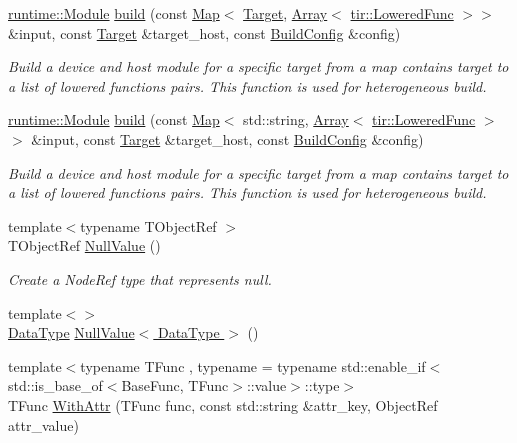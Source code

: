 \begin{DoxyCompactItemize}
\hyperlink{classtvm_1_1runtime_1_1Module}{runtime\+::\+Module} \hyperlink{namespacetvm_ab60e7a2ecb2573f5380a476d8c5aca6d}{build} (const \hyperlink{classtvm_1_1Map}{Map}$<$ \hyperlink{classtvm_1_1Target}{Target}, \hyperlink{classtvm_1_1Array}{Array}$<$ \hyperlink{classtvm_1_1tir_1_1LoweredFunc}{tir\+::\+Lowered\+Func} $>$$>$ \&input, const \hyperlink{classtvm_1_1Target}{Target} \&target\+\_\+host, const \hyperlink{classtvm_1_1BuildConfig}{Build\+Config} \&config)
\begin{DoxyCompactList}\small\item\em Build a device and host module for a specific target from a map contains target to a list of lowered functions pairs. This function is used for heterogeneous build. \end{DoxyCompactList}\item 
\hyperlink{classtvm_1_1runtime_1_1Module}{runtime\+::\+Module} \hyperlink{namespacetvm_a879a810167b7f65cbfe7975da151c06d}{build} (const \hyperlink{classtvm_1_1Map}{Map}$<$ std\+::string, \hyperlink{classtvm_1_1Array}{Array}$<$ \hyperlink{classtvm_1_1tir_1_1LoweredFunc}{tir\+::\+Lowered\+Func} $>$$>$ \&input, const \hyperlink{classtvm_1_1Target}{Target} \&target\+\_\+host, const \hyperlink{classtvm_1_1BuildConfig}{Build\+Config} \&config)
\begin{DoxyCompactList}\small\item\em Build a device and host module for a specific target from a map contains target to a list of lowered functions pairs. This function is used for heterogeneous build. \end{DoxyCompactList}\item 
{\footnotesize template$<$typename T\+Object\+Ref $>$ }\\T\+Object\+Ref \hyperlink{namespacetvm_ab6c242e8ac09beb463fba306948b7f15}{Null\+Value} ()
\begin{DoxyCompactList}\small\item\em Create a Node\+Ref type that represents null. \end{DoxyCompactList}\item 
{\footnotesize template$<$$>$ }\\\hyperlink{namespacetvm_a41918af1a1dc386388639a9d3ad06c5d}{Data\+Type} \hyperlink{namespacetvm_a28c693333c2b15702b1a9a57dec0fbf5}{Null\+Value$<$ Data\+Type $>$} ()
\item 
{\footnotesize template$<$typename T\+Func , typename  = typename std\+::enable\+\_\+if$<$           std\+::is\+\_\+base\+\_\+of$<$\+Base\+Func, T\+Func$>$\+::value$>$\+::type$>$ }\\T\+Func \hyperlink{namespacetvm_ae3262464aa53a0c8b1b6078dfadab049}{With\+Attr} (T\+Func func, const std\+::string \&attr\+\_\+key, Object\+Ref attr\+\_\+value)

\end{DoxyCompactItemize}
